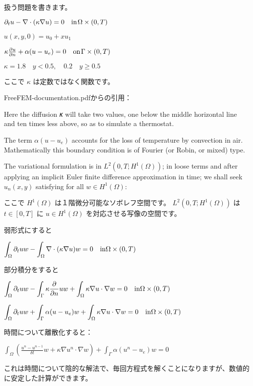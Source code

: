 扱う問題を書きます。

$\partial_t u -\nabla\cdot(\kappa\nabla u)=0 \quad {\rm in}\hspace{1pt} \Omega\times(0,T)$

$u(x,y,0)=u_0+x u_1$

$\kappa \frac{\partial u}{\partial n}+\alpha(u-u_e)=0 \quad {\rm on} \hspace{1pt} \Gamma\times(0,T)$

$\kappa=1.8 \quad y<0.5, \quad 0.2 \quad y \ge 0.5$

ここで $\kappa$ は定数ではなく関数です。

FreeFEM-documentation.pdfからの引用：

Here the diffusion 𝜅 will take two values, one below the middle horizontal line and ten times less above, so as to simulate a thermostat.

The term $𝛼(𝑢 − 𝑢_𝑒)$ accounts for the loss of temperature by convection in air. Mathematically this boundary condition is of Fourier (or Robin, or mixed) type.

The variational formulation is in $𝐿^2(0,𝑇;𝐻^1(Ω))$; in loose terms and after applying an implicit Euler finite difference approximation in time; we shall seek $𝑢_𝑛(𝑥, 𝑦)$ satisfying for all $𝑤 ∈ 𝐻^1(Ω)$:

ここで $H^1(\Omega)$ は１階微分可能なソボレフ空間です。
$𝐿^2(0,𝑇;𝐻^1(Ω))$ は $t\in[0,T]$ に $u\in H^1(\Omega)$ を対応させる写像の空間です。

弱形式にすると

$\displaystyle\int_\Omega \partial_t u w -\displaystyle\int_\Omega \nabla\cdot(\kappa\nabla u) w=0 \quad {\rm in} \Omega\times(0,T)$

部分積分をすると

$\displaystyle\int_\Omega \partial_t u w -\displaystyle\int_\Gamma \kappa\frac{\partial}{\partial n} u w+\displaystyle\int_\Omega \kappa\nabla u\cdot\nabla w=0 \quad {\rm in} \Omega\times(0,T)$

$\displaystyle\int_\Omega \partial_t u w +\displaystyle\int_\Gamma \alpha(u-u_e) w+\displaystyle\int_\Omega \kappa\nabla u\cdot\nabla w=0 \quad {\rm in} \Omega\times(0,T)$

時間について離散化すると：

$\displaystyle\int_\Omega \left(\frac{u^n-u^{n-1}}{\delta t}w+\kappa \nabla u^n \cdot \nabla w\right)+\int_\Gamma \alpha(u^n-u_e)w=0$

これは時間について陰的な解法で、毎回方程式を解くことになりますが、数値的に安定した計算ができます。
